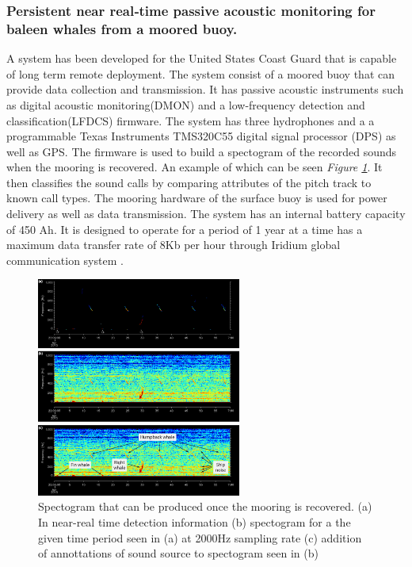 
\subsubsection{Persistent near real‐time passive acoustic monitoring for baleen whales from a moored buoy.}
A system has been developed for the United States Coast Guard that is capable of long term remote deployment. 
The system consist of a moored buoy that can provide data collection and transmission.
It has passive acoustic instruments such as digital acoustic monitoring(DMON) and a low-frequency detection and classification(LFDCS) firmware.
The system has three hydrophones and a a programmable Texas Instruments TMS320C55 digital signal processor (DPS) as well as GPS.
The firmware is used to build a spectogram of the recorded sounds when the mooring is recovered.
An example of which can be seen \textit{Figure \ref{fig:SpectoExamp}}.
It then classifies the sound calls by comparing attributes of the pitch track to known call types. 
The mooring hardware of the surface buoy is used for power delivery as well as data transmission. 
The system has an internal battery capacity of 450 Ah. 
It is designed to operate for a period of 1 year at a time has a maximum data transfer rate of 8Kb per hour through Iridium global communication system \cite{baumgartner_persistent_2019}.

\begin{figure}[h]
    \centering
    \includegraphics[width=0.60\textwidth]{graphics/spectogram.png}
    \caption{Spectogram that can be produced once the mooring is recovered.
    (a) In near-real time detection information (b) spectogram for a the given time period seen in (a) at 2000Hz sampling rate (c) addition of annottations of sound source to spectogram seen in (b)\cite{baumgartner_persistent_2019}}
    \label{fig:SpectoExamp}
\end{figure}

